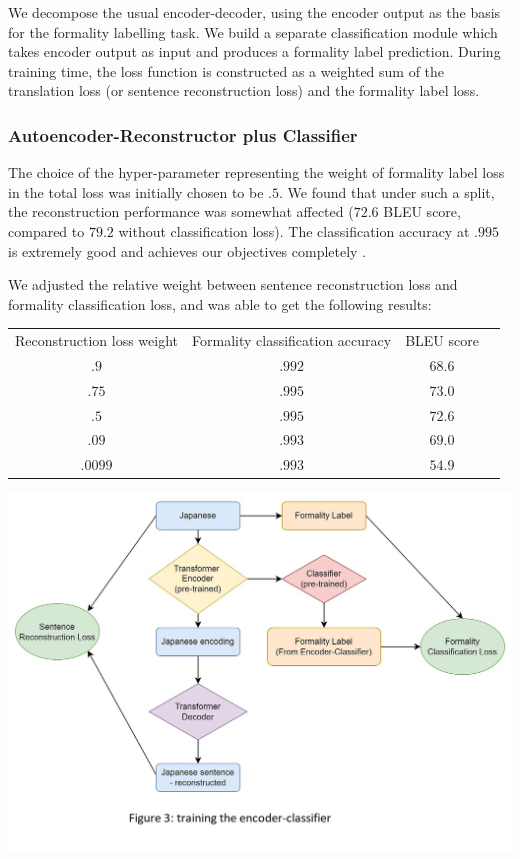 \documentclass[11pt]{article}
\begin{document}
We decompose the usual encoder-decoder, using the encoder output as the basis for the formality labelling task. We build a separate classification module which takes encoder output as input and produces a formality label prediction. During training time, the loss function is constructed as a weighted sum of the translation loss (or sentence reconstruction loss) and the formality label loss.

\subsubsection{Autoencoder-Reconstructor plus Classifier}

The choice of the hyper-parameter representing the weight of formality label loss in the total loss was initially chosen to be $.5$. We found that under such a split, the reconstruction performance was somewhat affected ($72.6$ BLEU score, compared to $79.2$ without classification loss). The classification accuracy at $.995$ is extremely good and achieves our objectives completely .

We adjusted the relative weight between sentence reconstruction loss and formality classification loss, and was able to get the following results:

\begin{tabular}{ c c c c }
    Reconstruction loss weight & Formality classification accuracy & BLEU score \\
    $.9$ & $.992$ & $68.6$ \\
    $.75$ & $.995$ & $73.0$ \\
    $.5$ & $.995$ & $72.6$ \\
    $.09$ & $.993$ & $69.0$ \\
    $.0099$ & $.993$ & $54.9$ \\
\end{tabular}

\includegraphics{images/encoder_classifier.jpg}
\end{document}
